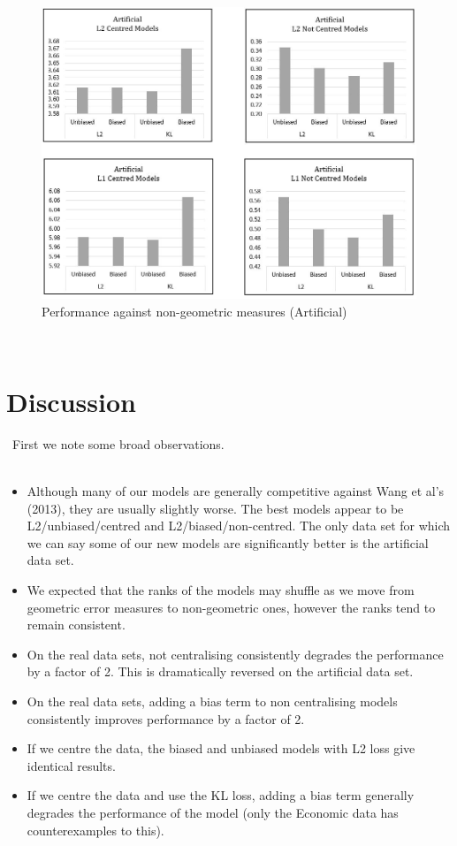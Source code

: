 \documentclass[BSc]{usydthesis}
\numberwithin{equation}{chapter}
\theoremstyle{remark}
\begin{document}
\begin{figure}
 \centering
 \includegraphics[scale=0.6,keepaspectratio=true]{graphs/G-Arti2.JPG}
 \caption{Performance against non-geometric measures (Artificial)}
\end{figure}

\newpage
\ \\
\section{Discussion}
\
First we note some broad observations.\\
\\

\begin{itemize}
 \item Although many of our models are generally competitive against Wang et al's (2013), they are usually slightly worse. The best models appear to be L2/unbiased/centred and L2/biased/non-centred. The only data set for which we can say some of our new models are significantly better is the artificial data set.\\
 \item We expected that the ranks of the models may shuffle as we move from geometric error measures to non-geometric ones, however the ranks tend to remain consistent.\\
 \item On the real data sets, not centralising consistently degrades the performance by a factor of 2. This is dramatically reversed on the artificial data set.\\
 \item On the real data sets, adding a bias term to non centralising models consistently improves performance by a factor of 2. \\
 \item If we centre the data, the biased and unbiased models with L2 loss give identical results.\\
 \item If we centre the data and use the KL loss, adding a bias term generally degrades the performance of the model (only the Economic data has counterexamples to this).\\ 
\end{itemize}
\end{document}
